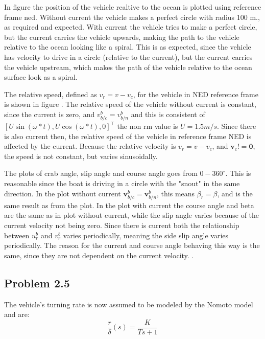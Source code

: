 In figure  the position of the vehicle realtive to the ocean is plotted using reference frame ned. Without current the vehicle makes a perfect circle with radius 100 m., as required and expected. With current the vehicle tries to make a perfect circle, but the current carries the vehicle upwards, making the path to the vehicle relative to  the ocean looking like a spiral. This is as expected, since the vehicle has velocity to drive in a circle (relative to the current), but the current carries the vehicle upstream, which makes the path of the vehicle relative to the ocean surface look as a spiral.

The relative speed, defined as $v_r = v - v_c$, for the vehicle in NED reference frame is shown in figure . The relative speed of the vehicle without current is constant, since the current is zero, and $v^b_{b/c}=v^b_{b/n}$ and this is consistent of $[U \sin(\omega *t), U \cos(\omega*t),0]^\top$ the non rm value is $U = 1.5 m/s$. Since there is also current then, the relative speed of the vehicle in reference frame NED is affected by the current. Because the relative velocity is $v_r = v - v_c$, and $\mathbf{v}_c != \mathbf{0}$, the speed is not constant, but varies sinusoidally. 

The plots of crab angle, slip angle and course angle goes from $0-360^\circ$. This is reasonable since the boat is driving in a circle with the "snout"  in the same direction. In the plot without current $\mathbf{v}^b_{b/c} = \mathbf{v}^b_{b/n} $, this means $\beta_r = \beta$, and is the same result as from the plot. In the plot with current the course angle and beta are the same as in plot without current, while the slip angle varies because of the current velocity not being zero. Since there is current both the relationship between $u^b_r$ and $v^b_r$ varies periodically, meaning the side slip angle varies periodically. The reason for the current and course angle behaving this way is the same, since they are not dependent on the current velocity.  .

\subsection*{Problem 2.5}

The vehicle's turning rate is now assumed to be modeled by the Nomoto model and are:
\begin{equation}
	\frac{r}{\delta} (s) = \frac{K}{Ts+1}
\end{equation}

